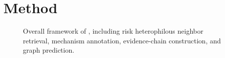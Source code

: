 \section{Method}


\begin{figure}[t]
  \centering
  \caption{Overall framework of \method, including risk heterophilous neighbor retrieval, mechanism annotation, evidence-chain construction, and graph prediction.}
  \label{fig:framework}
\end{figure}

